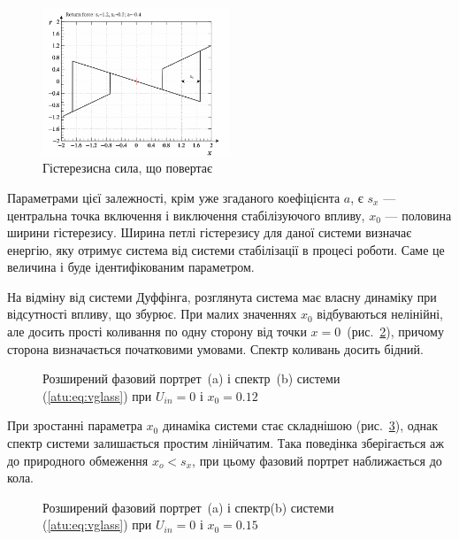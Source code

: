 \begin{figure}[htb!]
\centerline{\includegraphics[width=0.5\textwidth]{p/cha/vg/vg_rf-p_rf.png} }
\caption{Гістерезисна сила, що повертає}
\label{atu:f:vg_rf}
\end{figure}

Параметрами цієї залежності, крім уже згаданого коефіцієнта
$a$, є
$s_x$ --- центральна точка включення і виключення стабілізуючого
впливу,
$x_0$ --- половина ширини гістерезису. Ширина петлі гістерезису
для даної системи визначає енергію, яку отримує система від
системи стабілізації в процесі роботи. Саме це величина і буде
ідентифікованим параметром.


На відміну від системи Дуффінга, розглянута система має власну
динаміку при відсутності впливу, що збурює. При малих значеннях
$x_0$ відбуваються нелінійні, але досить прості коливання по
одну сторону від точки
$x = 0$~(рис.~\ref{atu:f:vglass_phase_f_u00}), причому сторона визначається
початковими умовами. Спектр коливань досить бідний.

\begin{figure}[htb!]
  \caption{Розширений фазовий портрет~(a) і спектр~(b) системи (\ref{atu:eq:vglass}) при $ U_{in} = 0 $ і $ x_0 = 0.12 $}
\label{atu:f:vglass_phase_f_u00}
\end{figure}

При зростанні параметра
$x_0$ динаміка системи стає складнішою (рис.~\ref{atu:f:vglass_phase_f_u01}),
однак спектр системи залишається простим лінійчатим. Така
поведінка зберігається аж до природного обмеження
$ x_o <s_x $, при цьому фазовий портрет наближається до кола.

\begin{figure}[htb!]
  \caption{Розширений фазовий портрет~(a) і спектр(b) системи (\ref{atu:eq:vglass}) при $ U_{in} = 0 $ і $ x_0 = 0.15 $}
\label{atu:f:vglass_phase_f_u01}
\end{figure}

